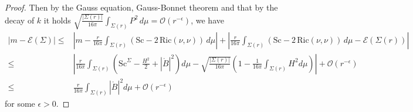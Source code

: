 \documentclass[12pt,a4paper]{amsart}
\theoremstyle{plain}
\theoremstyle{definition}
\begin{document}
\begin{proof}
 Then by the  Gauss equation, Gauss-Bonnet theorem and  that by the decay of $k$ it holds $\sqrt{\frac{|\Sigma(r)|}{16\pi}}  \int_{\Sigma(r)} P^2\,d\mu= \mathcal{O}(r ^{-\epsilon})$,  we have 
\begin{equation}
    \begin{split}
        |m - \mathcal{E}(\Sigma)| 
\leq&   \left| m - \frac{r}{16\pi} \int_{\Sigma(r)} (\mathrm{Sc} - 2\,\mathrm{Ric}(\nu,\nu)) \, d\mu \right|
+ \left| \frac{r}{16\pi} \int_{\Sigma(r)} (\mathrm{Sc} - 2\,\mathrm{Ric}(\nu,\nu)) \, d\mu - \mathcal{E}(\Sigma(r)) \right|\\
\leq& \left|  \frac{r}{16\pi}\int_{\Sigma(r)}\left(\mathrm{Sc}^{\Sigma} - \frac{H^2}{2} + |\mathring{B}|^2\right)d\mu 
- \sqrt{\frac{|\Sigma(r)|}{16\pi}}\left(1 - \frac{1}{16\pi} \int_{\Sigma(r)}H^2  d\mu\right) \right| + \mathcal{O}(r ^{-\epsilon}) \\
\leq & \frac{r}{16\pi}\int_{\Sigma(r)} |\mathring{B}|^2d\mu  + \mathcal{O}(r ^{-\epsilon})
    \end{split}
\end{equation}
for some $\epsilon>0$.  



\end{proof}
\end{document}
